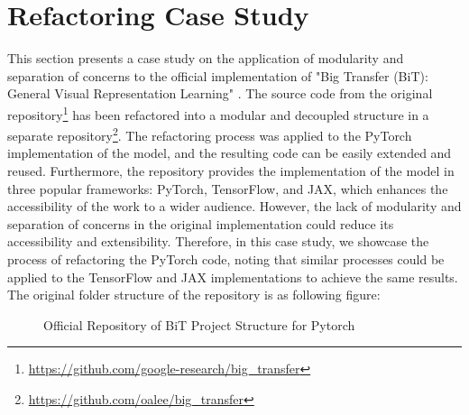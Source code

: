 \section{Refactoring Case Study}\label{transfer-study}



This section presents a case study on the application of modularity and separation of concerns to the official implementation of "Big Transfer (BiT): General Visual Representation Learning" \cite{transferlearning}. The source code from the original repository\footnote{\url{https://github.com/google-research/big_transfer}} has been refactored into a modular and decoupled structure in a separate repository\footnote{\url{https://github.com/oalee/big_transfer}}. The refactoring process was applied to the PyTorch implementation of the model, and the resulting code can be easily extended and reused. Furthermore, the repository provides the implementation of the model in three popular frameworks: PyTorch, TensorFlow, and JAX, which enhances the accessibility of the work to a wider audience. However, the lack of modularity and separation of concerns in the original implementation could reduce its accessibility and extensibility. Therefore, in this case study, we showcase the process of refactoring the PyTorch code, noting that similar processes could be applied to the TensorFlow and JAX implementations to achieve the same results. The original folder structure of the repository is as following figure:

\begin{figure}[H]
\centering
{}
\caption{
Official Repository of BiT Project Structure for Pytorch
}
\end{figure}



